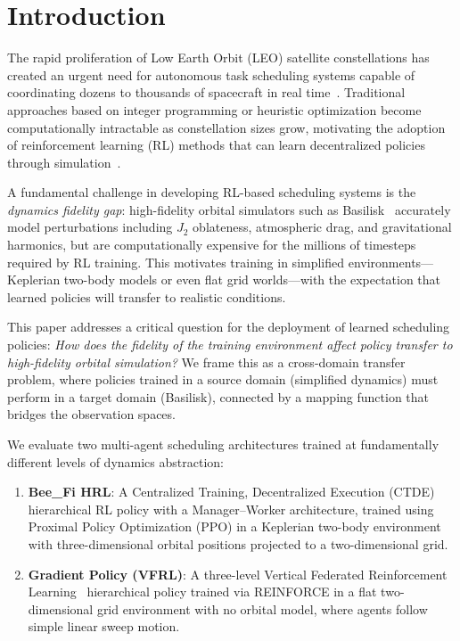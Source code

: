 \documentclass[conference]{IEEEtran}
\begin{document}
\section{Introduction}
\label{sec:intro}

The rapid proliferation of Low Earth Orbit (LEO) satellite constellations has created an urgent need for autonomous task scheduling systems capable of coordinating dozens to thousands of spacecraft in real time~\cite{del2019technical}. Traditional approaches based on integer programming or heuristic optimization become computationally intractable as constellation sizes grow, motivating the adoption of reinforcement learning (RL) methods that can learn decentralized policies through simulation~\cite{hu2024satellite}.

A fundamental challenge in developing RL-based scheduling systems is the \textit{dynamics fidelity gap}: high-fidelity orbital simulators such as Basilisk~\cite{kenneally2020basilisk} accurately model perturbations including $J_2$ oblateness, atmospheric drag, and gravitational harmonics, but are computationally expensive for the millions of timesteps required by RL training. This motivates training in simplified environments---Keplerian two-body models or even flat grid worlds---with the expectation that learned policies will transfer to realistic conditions.

This paper addresses a critical question for the deployment of learned scheduling policies: \textit{How does the fidelity of the training environment affect policy transfer to high-fidelity orbital simulation?} We frame this as a cross-domain transfer problem, where policies trained in a source domain (simplified dynamics) must perform in a target domain (Basilisk), connected by a mapping function that bridges the observation spaces.

We evaluate two multi-agent scheduling architectures trained at fundamentally different levels of dynamics abstraction:

\begin{enumerate}
    \item \textbf{Bee\_Fi HRL}: A Centralized Training, Decentralized Execution (CTDE) hierarchical RL policy with a Manager--Worker architecture, trained using Proximal Policy Optimization (PPO) in a Keplerian two-body environment with three-dimensional orbital positions projected to a two-dimensional grid.
    \item \textbf{Gradient Policy (VFRL)}: A three-level Vertical Federated Reinforcement Learning~\cite{vezhnevets2017feudal} hierarchical policy trained via REINFORCE in a flat two-dimensional grid environment with no orbital model, where agents follow simple linear sweep motion.
\end{enumerate}
\end{document}
